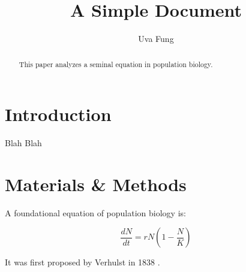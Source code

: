 \documentclass[12pt]{article}
\title{A Simple Document}
\author{Uva Fung}
\date{}
\begin{document}
    \maketitle

    \begin{abstract}
        This paper analyzes a seminal equation in population biology.
    \end{abstract}

    \section{Introduction}
        Blah Blah
        
    \section{Materials \& Methods}

    A foundational equation of population biology is:

    \begin{equation}
        \frac{dN}{dt} = r N (1 - \frac{N}{K})
    \end{equation}

    It was first proposed by Verhulst in 1838 \cite{verhulst1838notice}.

    

    
\end{document}
